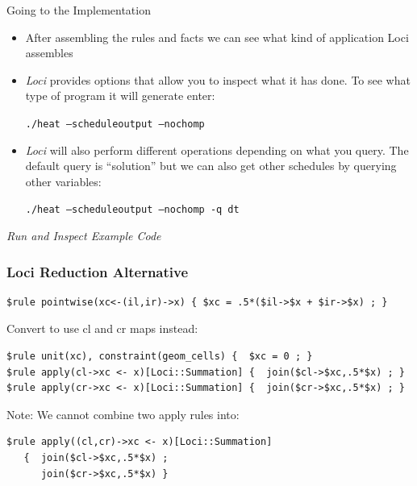 \documentclass{beamer}
\begin{document}
\begin{frame}{Going to the Implementation}
\begin{itemize}
\item After assembling the rules and facts we can see what kind of application Loci assembles
\item {\it Loci} provides options that allow you to inspect what it has done.  To see what type of program it will generate enter:

{\tt ./heat --scheduleoutput --nochomp}

\item {\it Loci} will also perform different operations depending on what you query.  The default query is ``solution'' but we can also get other schedules by querying other variables:

{\tt ./heat --scheduleoutput --nochomp -q dt}
\end{itemize}
{\it Run and Inspect Example Code}
\end{frame}

\begin{frame}[fragile=singleslide]\frametitle{Loci Reduction Alternative}
\scriptsize
\begin{verbatim}
$rule pointwise(xc<-(il,ir)->x) { $xc = .5*($il->$x + $ir->$x) ; }
\end{verbatim}
Convert to use cl and cr maps instead:
\begin{verbatim}
$rule unit(xc), constraint(geom_cells) {  $xc = 0 ; }
$rule apply(cl->xc <- x)[Loci::Summation] {  join($cl->$xc,.5*$x) ; }
$rule apply(cr->xc <- x)[Loci::Summation] {  join($cr->$xc,.5*$x) ; }
\end{verbatim}
Note: We cannot combine two apply rules into:
\begin{verbatim}
$rule apply((cl,cr)->xc <- x)[Loci::Summation] 
   {  join($cl->$xc,.5*$x) ; 
      join($cr->$xc,.5*$x) }
\end{verbatim}

\end{frame}
\end{document}
